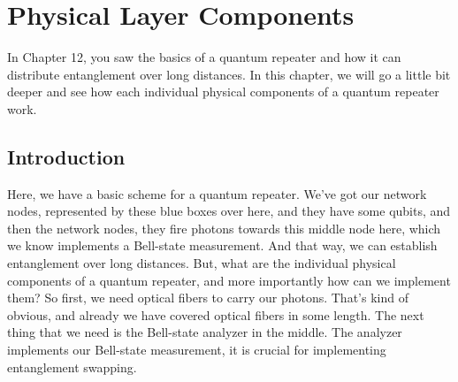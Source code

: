 
\chapter{Physical Layer Components}

In Chapter 12, you saw the basics of a quantum repeater and how it can distribute entanglement over long distances. In this chapter, we will go a little bit deeper and see how each individual physical components of a quantum repeater work.

\section{Introduction}

Here, we have a basic scheme for a quantum repeater. We've got our network nodes, represented by these blue boxes over here, and they have some qubits, and then the network nodes, they fire photons towards this middle node here, which we know implements a Bell-state measurement. And that way, we can establish entanglement over long distances. But, what are the individual physical components of a quantum repeater, and more importantly how can we implement them? So first, we need optical fibers to carry our photons. That's kind of obvious, and already we have covered optical fibers in some length. The next thing that we need is the Bell-state analyzer in the middle. The analyzer implements our Bell-state measurement, it is crucial for implementing entanglement swapping.


